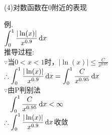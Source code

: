 (4)对数函数在$0$附近的表现\\
\begin{center}
\end{center}
例.\\
$\displaystyle\int_0^1\frac{|\ln(x)|}{x^{0.9}}\mathop{}\!\mathrm{d} x$\\
推导过程:\\
$\because$当$0<x<1$时，$\displaystyle|\ln(x)|\leqslant\frac{C}{x^{0.05}}$\\
$\displaystyle\therefore\int_0^1\frac{|\ln(x)|}{x^{0.9}}\mathop{}\!\mathrm{d} x=\int_0^1\frac{C}{x^{0.95}}\mathop{}\!\mathrm{d} x$\\
$\because$由P判别法\\
$\displaystyle\phantom{\because}\int_0^1\frac{C}{x^{0.95}}\mathop{}\!\mathrm{d} x<\infty$\\
$\displaystyle\therefore\int_0^1\frac{|\ln(x)|}{x^{0.9}}\mathop{}\!\mathrm{d} x$收敛
